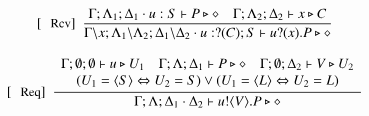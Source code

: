 \begin{figure}[!t]
\[\begin{array}{c}
		\trule{Rcv}~~\tree{
			\Gamma; \Lambda_1; \Delta_1 \cat u: S  \proves P \hastype \Proc
			\quad
			\Gamma; \Lambda_2; \Delta_2 \proves x \hastype C
		}{
			\Gamma \backslash x; \Lambda_1 \backslash \Lambda_2; \Delta_1 \backslash \Delta_2 
			\cat u: \btinp{C} S \vdash \binp{u}{x} P \hastype \Proc
		}
		\\[6mm]
%

		\trule{Req}~~\tree{
			\begin{array}{c}
				\Gamma; \es; \es \proves u \hastype U_1
				\quad
				\Gamma; \Lambda; \Delta_1 \proves P \hastype \Proc
				\quad
				\Gamma; \es; \Delta_2 \proves V \hastype U_2
				\\
				(U_1 = \chtype{S} \Leftrightarrow U_2 = S)
				\lor
				(U_1 = \chtype{L} \Leftrightarrow U_2 = L)
			\end{array}
		}{
			\Gamma; \Lambda; \Delta_1 \cat \Delta_2 \proves \bout{u}{V} P \hastype \Proc
		}
		\\[6mm]



\end{array}\]
\end{figure}
